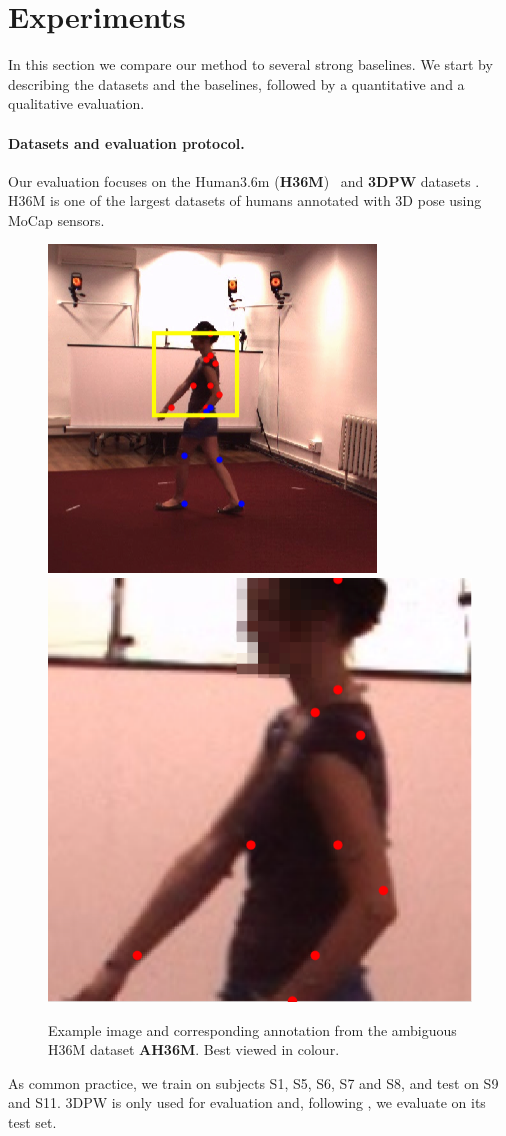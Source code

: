 \section{Experiments}\label{s:exp}

In this section we compare our method to several strong baselines.
We start by describing the datasets and the baselines, followed by a quantitative and a qualitative evaluation.





\paragraph{Datasets and evaluation protocol.}

Our evaluation focuses on the Human3.6m (\textbf{H36M})~\cite{ionescu2013human3,IonescuSminchisescu11} 
and \textbf{3DPW} datasets \cite{vonmarcard2018recovering}.
H36M is one of the largest datasets of humans annotated with 3D pose using MoCap sensors.
\begin{figure}
  \begin{center}
           \includegraphics[width=0.49\linewidth]{exps/dataset_uncrop.png}
    \includegraphics[width=0.49\linewidth]{exps/cropped3_blur.png}
  \end{center}
    \caption{Example image and corresponding annotation from the ambiguous H36M dataset \textbf{AH36M}. Best viewed in colour.\label{f:ambi_samples}}
    \vspace{-1.8em}
\end{figure}
As common practice, we train on subjects S1, S5, S6, S7 and S8, and test on S9 and S11. 3DPW is only used for evaluation and, following \cite{kolotouros19convolutional}, we evaluate on its test set.

